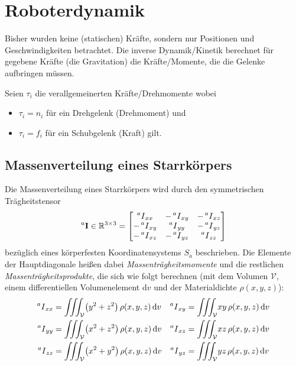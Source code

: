 \chapter{Roboterdynamik}
	Bisher wurden keine (statischen) Kräfte, sondern nur Positionen und Geschwindigkeiten betrachtet. Die inverse Dynamik/Kinetik \INVDYN berechnet für gegebene Kräfte (\zB die Gravitation) die Kräfte/Momente, die die Gelenke aufbringen müssen.
	
	Seien \( \tau_i \) die verallgemeinerten Kräfte/Drehmomente wobei
	\begin{itemize}
		\item \( \tau_i = n_i \) für ein Drehgelenk (Drehmoment) und
		\item \( \tau_i = f_i \) für ein Schubgelenk (Kraft) gilt.
	\end{itemize}

	\section{Massenverteilung eines Starrkörpers}
		Die Massenverteilung eines Starrkörpers wird durch den symmetrischen Trägheitstensor
		\begin{equation*}
			\prescript{a}{}{\boldsymbol{\mathrm{I}}} \in \mathbb{R}^{3 \times 3} =
				\begin{bmatrix}
					\prescript{a}{}{I}_{xx}  & -\prescript{a}{}{I}_{xy} & -\prescript{a}{}{I}_{xz} \\
					-\prescript{a}{}{I}_{xy} & \prescript{a}{}{I}_{yy}  & -\prescript{a}{}{I}_{yz} \\
					-\prescript{a}{}{I}_{xz} & -\prescript{a}{}{I}_{yz} & \prescript{a}{}{I}_{zz}
				\end{bmatrix}
		\end{equation*}
		bezüglich eines körperfesten Koordinatensystems \(S_a\) beschrieben. Die Elemente der Hauptdiagonale heißen dabei \emph{Massenträgheitsmomente} und die restlichen \emph{Massenträgheitsprodukte}, die sich wie folgt berechnen (mit dem Volumen \(\mathcal{V}\), einem differentiellen Volumenelement \( \text{d}v \) und der Materialdichte \( \rho(x, y, z) \)):
		\begin{align*}
			\prescript{a}{}{I}_{xx} &= \iiint_{\mathcal{V}} \! \big(y^2 + z^2\big) \,\rho(x, y, z) \dd{v} & \prescript{a}{}{I}_{xy} &= \iiint_{\mathcal{V}} \! xy \,\rho(x, y, z) \dd{v} \\
			\prescript{a}{}{I}_{yy} &= \iiint_{\mathcal{V}} \! \big(x^2 + z^2\big) \,\rho(x, y, z) \dd{v} & \prescript{a}{}{I}_{xz} &= \iiint_{\mathcal{V}} \! xz \,\rho(x, y, z) \dd{v} \\
			\prescript{a}{}{I}_{zz} &= \iiint_{\mathcal{V}} \! \big(x^2 + y^2\big) \,\rho(x, y, z) \dd{v} & \prescript{a}{}{I}_{yz} &= \iiint_{\mathcal{V}} \! yz \,\rho(x, y, z) \dd{v}
		\end{align*}
		
